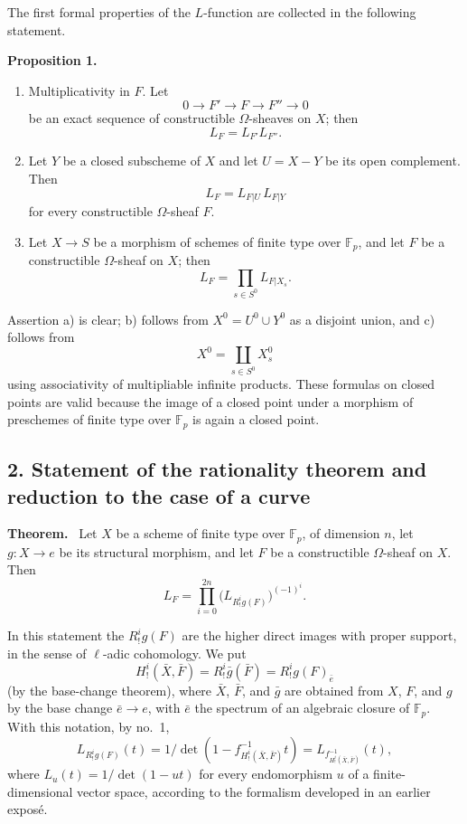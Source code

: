\documentclass[11pt]{article}
\newenvironment{statement}[1]{\par\medskip\noindent\textbf{#1.}\ }{\par\medskip}
\begin{document}
The first formal properties of the $L$-function are collected in the following statement.

\label{sga5:XV:proposition:1:3}\begin{statement}{Proposition 1}
\begin{enumerate}[label=\alph*)]
\item Multiplicativity in $F$. Let
\[
0\longrightarrow F'\longrightarrow F\longrightarrow F''\longrightarrow0
\]
be an exact sequence of constructible $\Omega$-sheaves on $X$; then
\[
L_F=L_{F'}L_{F''}.
\]
\item Let $Y$ be a closed subscheme of $X$ and let $U=X-Y$ be its open complement. Then
\[
L_F=L_{F|U}\,L_{F|Y}
\]
for every constructible $\Omega$-sheaf $F$.
\item Let $X\to S$ be a morphism of schemes of finite type over $\mathbb F_p$, and let $F$ be a constructible $\Omega$-sheaf on $X$; then
\[
L_F=\prod_{s\in S^0}L_{F|X_s}.
\]
\end{enumerate}
\end{statement}

Assertion a) is clear; b) follows from $X^0=U^0\cup Y^0$ as a disjoint union, and c) follows from
\[
X^0=\coprod_{s\in S^0}X_s^0
\]
using associativity of multipliable infinite products. These formulas on closed points are valid because the image of a closed point under a morphism of preschemes of finite type over $\mathbb F_p$ is again a closed point.

\subsection*{2. Statement of the rationality theorem and reduction to the case of a curve}\label{sga5:XV:subsection:2:2}

\begin{statement}{Theorem}
Let $X$ be a scheme of finite type over $\mathbb F_p$, of dimension $n$, let $g:X\to e$ be its structural morphism, and let $F$ be a constructible $\Omega$-sheaf on $X$. Then
\[
L_F=\prod_{i=0}^{2n}\bigl(L_{R^i_!g(F)}\bigr)^{(-1)^i}.
\tag{1}\label{sga5:XV:equation:1}
\]
\end{statement}

In this statement the $R^i_!g(F)$ are the higher direct images with proper support, in the sense of $\ell$-adic cohomology. We put
\[
H^i_!(\bar X,\bar F)=R^i_!\bar g(\bar F)=R^i_!g(F)_{\bar e}
\]
(by the base-change theorem), where $\bar X$, $\bar F$, and $\bar g$ are obtained from $X$, $F$, and $g$ by the base change $\bar e\to e$, with $\bar e$ the spectrum of an algebraic closure of $\mathbb F_p$. With this notation, by no.~1,
\[
L_{R^i_!g(F)}(t)=1/\det(1-f^{-1}_{H^i_!(\bar X,\bar F)}t)
 =L_{f^{-1}_{H^i_!(\bar X,\bar F)}}(t),
\]
where $L_u(t)=1/\det(1-ut)$ for every endomorphism $u$ of a finite-dimensional vector space, according to the formalism developed in an earlier exposé.
\end{document}
